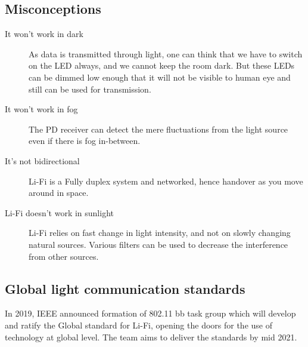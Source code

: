 \documentclass{article}
\begin{document}

\subsection{Misconceptions}

\begin{description}
    
    \item [It won't work in dark] As data is transmitted through light, one can
        think that we have to switch on the LED always, and we cannot keep the
        room dark. But these LEDs can be dimmed low enough that it will not be
        visible to human eye and still can be used for transmission.

    \item [It won't work in fog] The PD receiver can detect the mere
        fluctuations from the light source even if there is fog in-between.

    \item [It's not bidirectional] Li-Fi is a Fully duplex system and
        networked, hence handover as you move around in space.
    
    \item [Li-Fi doesn't work in sunlight] Li-Fi relies on fast change in light
        intensity, and not on slowly changing natural sources. Various filters
        can be used to decrease the interference from other sources.
    
\end{description}

\subsection{Global light communication standards}

In 2019, IEEE announced formation of 802.11 bb task group which will develop
and ratify the Global standard for Li-Fi, opening the doors for the use of
technology at global level. 
The team aims to deliver the standards by mid 2021.


\printbibliography[heading=subbibliography]
\end{document}
